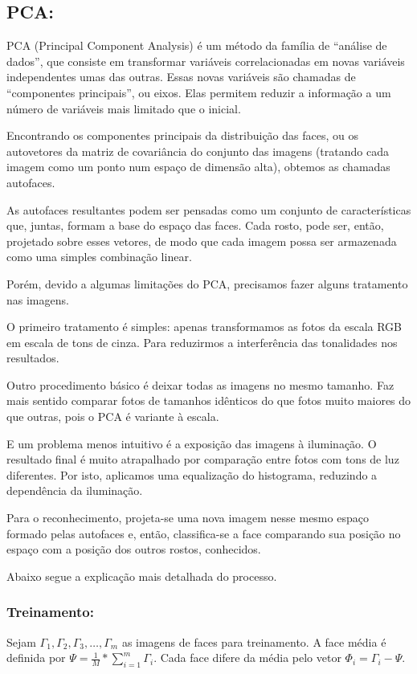 \documentclass[10pt,a4paper]{article}
\begin{document}
\subsection*{PCA:}

	PCA (Principal Component Analysis) é um método da família de “análise de dados”, que consiste em transformar variáveis correlacionadas em novas variáveis independentes umas das outras. Essas novas variáveis são chamadas de “componentes principais”, ou eixos. Elas permitem reduzir a informação a um número de variáveis mais limitado que o inicial.

	Encontrando os componentes principais da distribuição das faces, ou os autovetores da matriz de covariância do conjunto das imagens (tratando cada imagem como um ponto num espaço de dimensão alta), obtemos as chamadas autofaces.

	As autofaces resultantes podem ser pensadas como um conjunto de características que, juntas, formam a base do espaço das faces. Cada rosto, pode ser, então, projetado sobre esses vetores, de modo que cada imagem possa ser armazenada como uma simples combinação linear.

Porém, devido a algumas limitações do PCA, precisamos fazer alguns tratamento nas imagens.

	O primeiro tratamento é simples: apenas transformamos as fotos da escala RGB em escala de tons de cinza. Para reduzirmos a interferência das tonalidades nos resultados.

	Outro procedimento básico é deixar todas as imagens no mesmo tamanho. Faz mais sentido comparar fotos de tamanhos idênticos do que fotos muito maiores do que outras, pois o PCA é variante à escala.

	E um problema menos intuitivo é a exposição das imagens à iluminação. O resultado final é muito atrapalhado por comparação entre fotos com tons de luz diferentes. Por isto, aplicamos uma equalização do histograma, reduzindo a dependência da iluminação.


Para o reconhecimento, projeta-se uma nova imagem nesse mesmo espaço formado pelas autofaces e, então, classifica-se a face comparando sua posição no espaço com a posição dos outros rostos, conhecidos.

Abaixo segue a explicação mais detalhada do processo.
\subsubsection*{Treinamento:}
Sejam $\Gamma_1, \Gamma_2, \Gamma_3, \ldots, \Gamma_m$ as imagens de faces para treinamento. A face média é definida por {$\Psi  =\frac{1}{M}* \sum_{i=1}^m\Gamma_i$}. Cada face difere da média pelo vetor {$\Phi_i = \Gamma_i - \Psi$}.
\end{document}
